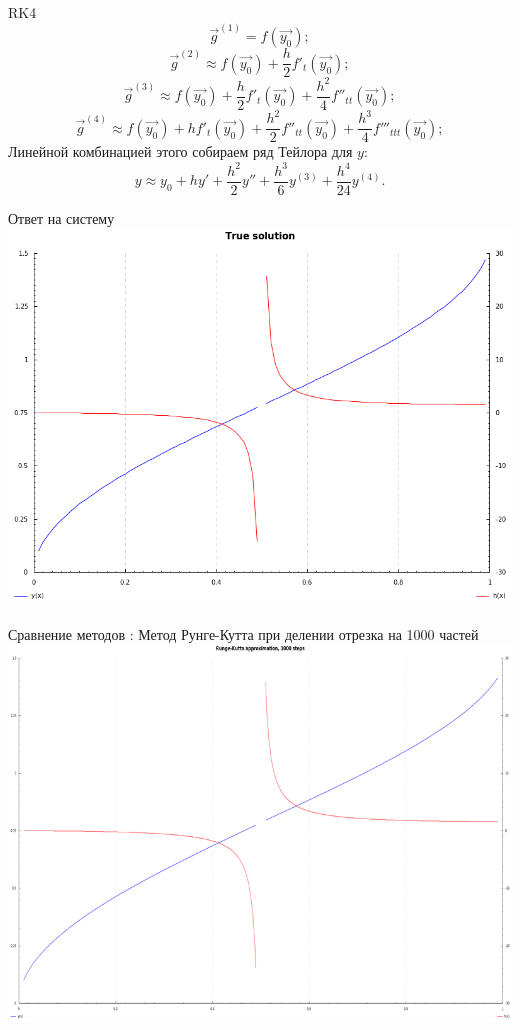 \documentclass{beamer}
\begin{document}
\begin{frame}{RK4}
	\[ \vec{g}^{(1)} = f(\vec{y_0}); \]
	\[ \vec{g}^{(2)} \approx f(\vec{y_0}) + \frac{h}{2}f'_t(\vec{y_0}); \]
	\[ \vec{g}^{(3)} \approx f(\vec{y_0}) + \frac{h}{2}f'_t(\vec{y_0}) + \frac{h^2}{4}f''_{tt}(\vec{y_0}); \]
	\[ \vec{g}^{(4)} \approx f(\vec{y_0}) + hf'_t(\vec{y_0}) + \frac{h^2}{2}f''_{tt}(\vec{y_0}) + \frac{h^3}{4}f'''_{ttt}(\vec{y_0});\]
	\pause Линейной комбинацией этого собираем ряд Тейлора для $y$:
	\[y \approx y_0 + hy' + \frac{h^2}{2}y'' + \frac{h^3}{6}y^{(3)} + \frac{h^4}{24}y^{(4)}. \]

\end{frame}

\begin{frame}{Ответ на систему}
    \includegraphics[scale=0.38]{solution}
\end{frame}

\begin{frame}{Сравнение методов : Метод Рунге-Кутта при делении отрезка на 1000 частей}
    \includegraphics[scale=0.38]{runge1000}
\end{frame}
\end{document}
